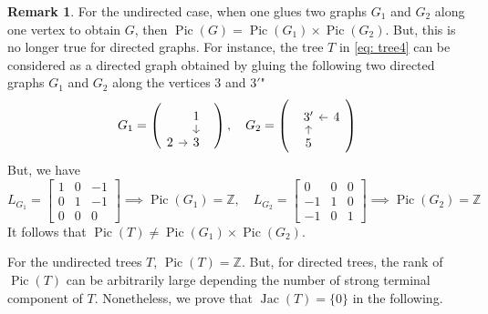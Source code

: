 \documentclass[11pt,reqno]{amsart}
\DeclareMathOperator{\Pic}{Pic}
\DeclareMathOperator{\Jac}{Jac}
\theoremstyle{definition}
\newtheorem{conj}[mydef]{Conjecture}
\newtheorem{rmk}[mydef]{Remark}
\theoremstyle{plain}
\begin{document}



\begin{rmk}
For the undirected case, when one glues two graphs $G_1$ and $G_2$ along one vertex to obtain $G$, then $\Pic(G)=\Pic(G_1) \times \Pic(G_2)$. But, this is no longer true for directed graphs. For instance, the tree $T$ in \eqref{eq: tree4} can be considered as a directed graph obtained by gluing the following two directed graphs $G_1$ and $G_2$ along the vertices $3$ and $3'$"
\begin{equation}
G_1=\left(\begin{tikzcd}[row sep=0.25cm, column sep=0.25cm]
& 1 \arrow[d] & \\
2 \arrow[r]& 3 
\end{tikzcd} \right), \quad G_2=\left(\begin{tikzcd}[row sep=0.25cm, column sep=0.25cm]
& 3' & 4 \arrow[l]\\
& 5 \arrow[u] &
\end{tikzcd} \right)
\end{equation}
But, we have
\[
L_{G_1}=\begin{bmatrix}
1 & 0 &-1\\
0 & 1 & -1\\
0& 0 & 0
\end{bmatrix} \implies \Pic(G_1)=\mathbb{Z}, \quad L_{G_2}=\begin{bmatrix}
0 & 0 &0\\
-1 & 1 & 0\\
-1& 0 & 1
\end{bmatrix} \implies \Pic(G_2)=\mathbb{Z}
\]
It follows that $\Pic(T) \neq \Pic(G_1) \times \Pic(G_2)$.
\end{rmk}

For the undirected trees $T$, $\Pic(T)=\mathbb{Z}$. But, for directed trees, the rank of $\Pic(T)$ can be arbitrarily large depending the number of strong terminal component of $T$. Nonetheless, we prove that $\Jac(T)=\{0\}$ in the following. 
\end{document}
